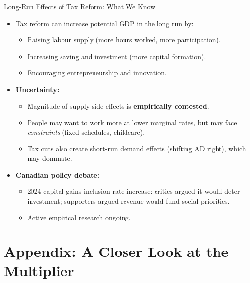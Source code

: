 \documentclass[aspectratio=169]{beamer}
\begin{document}
\begin{frame}{Long-Run Effects of Tax Reform: What We Know}
\transfade
\begin{itemize}[<+->]
  \item Tax reform can increase potential GDP in the long run by:
  \begin{itemize}[<+->]
    \item Raising labour supply (more hours worked, more participation).
    \item Increasing saving and investment (more capital formation).
    \item Encouraging entrepreneurship and innovation.
  \end{itemize}
  \item \textbf{Uncertainty:}
  \begin{itemize}[<+->]
    \item Magnitude of supply-side effects is \textbf{empirically contested}.
    \item People may want to work more at lower marginal rates, but may face \textit{constraints} (fixed schedules, childcare).
    \item Tax cuts also create short-run demand effects (shifting AD right), which may dominate.
  \end{itemize}
  \item \textbf{Canadian policy debate:}
  \begin{itemize}[<+->]
    \item 2024 capital gains inclusion rate increase: critics argued it would deter investment; supporters argued revenue would fund social priorities.
    \item Active empirical research ongoing.
  \end{itemize}
\end{itemize}
\end{frame}

\section*{Appendix: A Closer Look at the Multiplier}
\end{document}
